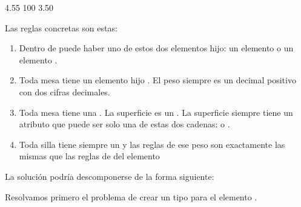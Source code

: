 \documentclass[letterpaper,10pt,spanish]{sphinxmanual}
\begin{document}
\begin{sphinxVerbatim}[commandchars=\\\{\}]
            4.55
             100
            3.50
\end{sphinxVerbatim}

Las reglas concretas son estas:
\begin{enumerate}
\item {} 
Dentro de  puede haber uno de estos dos elementos hijo: un elemento  o un elemento .

\item {} 
Toda mesa tiene un elemento hijo . El peso siempre es un decimal positivo con dos cifras decimales.

\item {} 
Toda mesa tiene una . La superficie es un . La superficie siempre tiene un atributo que puede ser solo una de estas dos cadenas:  o .

\item {} 
Toda silla tiene siempre un  y las reglas de ese peso son exactamente las mismas que las reglas de  del elemento 

\end{enumerate}

La solución podría descomponerse de la forma siguiente:

Resolvamos primero el problema de crear un tipo para el elemento .
\end{document}

